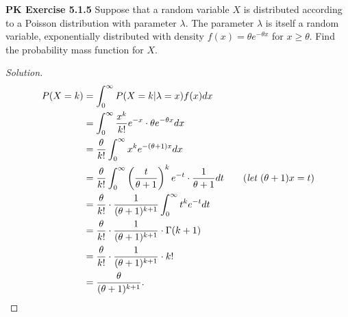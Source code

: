\documentclass{article}
\begin{document}
\newpage
\textbf{PK Exercise 5.1.5}
Suppose that a random variable $X$ is distributed according to a Poisson distribution with parameter $\lambda$. 
The parameter $\lambda$ is itself a random variable, exponentially distributed with density $f(x) = \theta e^{-\theta x}$ for $x\ge \theta$. 
Find the probability mass function for $X$.
\begin{proof}[Solution]
    \begin{align*}
        P(X = k) & = \int_{0}^{\infty} P(X = k|\lambda = x)f(x)dx \\
        & = \int_{0}^{\infty} \frac{x^k}{k!}e^{-x}\cdot\theta e^{-\theta x}dx \\
        & = \frac{\theta}{k!}\int_{0}^{\infty} x^ke^{-(\theta + 1)x}dx \\
        & = \frac{\theta}{k!}\int_{0}^{\infty} \left(\frac{t}{\theta+1}\right)^ke^{-t} \cdot \frac{1}{\theta+1}dt \qquad (\emph{let } (\theta+1)x = t) \\
        & = \frac{\theta}{k!}\cdot\frac{1}{(\theta+1)^{k+1}}\int_{0}^{\infty} t^ke^{-t} dt \\
        & = \frac{\theta}{k!}\cdot\frac{1}{(\theta+1)^{k+1}}\cdot\Gamma(k+1) \\
        & = \frac{\theta}{k!}\cdot\frac{1}{(\theta+1)^{k+1}}\cdot k! \\
        & = \frac{\theta}{(\theta+1)^{k+1}}.
    \end{align*}
\end{proof}
\bigbreak
\end{document}
